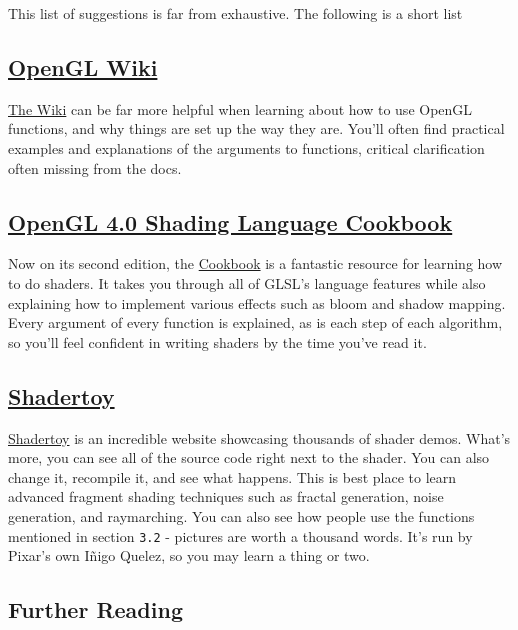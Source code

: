 \documentclass{scrartcl}
\begin{document}
This list of suggestions is far from exhaustive. The following is a short list 

\subsection{ \href{https://www.opengl.org/wiki/Main_Page}{OpenGL Wiki} }

\quad \href{https://www.opengl.org/wiki/Main_Page}{The Wiki} can be far more helpful when learning about how to use OpenGL functions, and why things are set up the way they are. You'll often find practical examples and explanations of the arguments to functions, critical clarification often missing from the docs.

\subsection{ \href{http://www.amazon.com/OpenGL-Shading-Language-Cookbook-Edition/dp/1782167021/}{OpenGL 4.0 Shading Language Cookbook}}

\quad Now on its second edition, the \href{http://www.amazon.com/OpenGL-Shading-Language-Cookbook-Edition/dp/1782167021/}{Cookbook} is a fantastic resource for learning how to do shaders. It takes you through all of GLSL's language features while also explaining how to implement various effects such as bloom and shadow mapping. Every argument of every function is explained, as is each step of each algorithm, so you'll feel confident in writing shaders by the time you've read it.

\subsection{ \href{https://www.shadertoy.com/}{Shadertoy} }

\quad \href{https://www.shadertoy.com/}{Shadertoy} is an incredible website showcasing thousands of shader demos. What's more, you can see all of the source code right next to the shader. You can also change it, recompile it, and see what happens. This is best place to learn advanced fragment shading techniques such as fractal generation, noise generation, and raymarching. You can also see how people use the functions mentioned in section \texttt{3.2} - pictures are worth a thousand words. It's run by Pixar's own I\~nigo Quelez, so you may learn a thing or two.

\subsection{ Further Reading}
\end{document}
